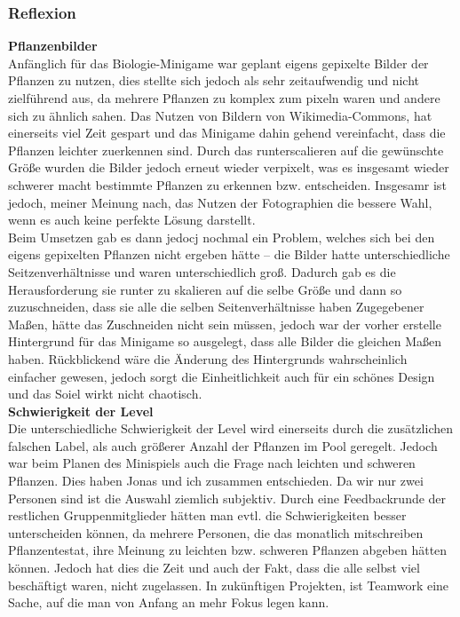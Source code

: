 \subsubsection{Reflexion}
\textbf{Pflanzenbilder} \\
Anfänglich für das Biologie-Minigame war geplant eigens gepixelte Bilder der Pflanzen zu nutzen, dies stellte sich jedoch als sehr zeitaufwendig und nicht zielführend aus, da mehrere Pflanzen zu komplex zum pixeln waren und andere sich zu ähnlich sahen.
Das Nutzen von Bildern von Wikimedia-Commons, hat einerseits viel Zeit gespart und das Minigame dahin gehend vereinfacht, dass die Pflanzen leichter zuerkennen sind. Durch das runterscalieren auf die gewünschte Größe wurden die Bilder jedoch erneut wieder verpixelt, was es insgesamt wieder schwerer macht bestimmte Pflanzen zu erkennen bzw. entscheiden.
Insgesamr ist jedoch, meiner Meinung nach, das Nutzen der Fotographien die bessere Wahl, wenn es auch keine perfekte Lösung darstellt. \\
Beim Umsetzen gab es dann jedocj nochmal ein Problem, welches sich bei den eigens gepixelten Pflanzen nicht ergeben hätte – die Bilder hatte unterschiedliche Seitzenverhältnisse und waren unterschiedlich groß. Dadurch gab es die Herausforderung sie runter zu skalieren auf die selbe Größe und dann so zuzuschneiden, dass sie alle die selben Seitenverhältnisse haben
Zugegebener Maßen, hätte das Zuschneiden nicht sein müssen, jedoch war der vorher erstelle Hintergrund für das Minigame so ausgelegt, dass alle Bilder die gleichen Maßen haben. Rückblickend wäre die Änderung des Hintergrunds wahrscheinlich einfacher gewesen, jedoch sorgt die Einheitlichkeit auch für ein schönes Design und das Soiel wirkt nicht chaotisch. \\
\textbf{Schwierigkeit der Level} \\
Die unterschiedliche Schwierigkeit der Level wird einerseits durch die zusätzlichen falschen Label, als auch größerer Anzahl der Pflanzen im Pool geregelt. Jedoch war beim Planen des Minispiels auch die Frage nach \glqq{}leichten\grqq{} und \glqq{}schweren\grqq{} Pflanzen. Dies haben Jonas und ich zusammen entschieden. Da wir nur zwei Personen sind ist die Auswahl ziemlich subjektiv.
Durch eine Feedbackrunde der restlichen Gruppenmitglieder hätten man evtl. die Schwierigkeiten besser unterscheiden können, da mehrere Personen, die das monatlich mitschreiben Pflanzentestat, ihre Meinung zu leichten bzw. schweren Pflanzen abgeben hätten können.
Jedoch hat dies die Zeit und auch der Fakt, dass die alle selbst viel beschäftigt waren, nicht zugelassen. In zukünftigen Projekten, ist Teamwork eine Sache, auf die man von Anfang an mehr Fokus legen kann. \\

